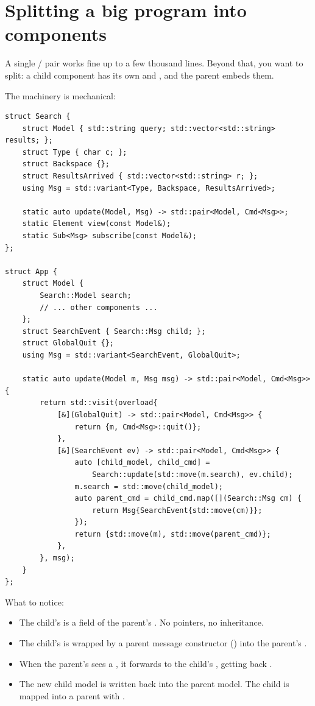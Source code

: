 \section{Splitting a big program into components}
\label{sec:elm:components}

A single  /  pair works fine up to a few
thousand lines. Beyond that, you want to split: a child component
has its own  and , and the parent embeds them.

The machinery is mechanical:

\begin{lstlisting}
struct Search {
    struct Model { std::string query; std::vector<std::string> results; };
    struct Type { char c; };
    struct Backspace {};
    struct ResultsArrived { std::vector<std::string> r; };
    using Msg = std::variant<Type, Backspace, ResultsArrived>;

    static auto update(Model, Msg) -> std::pair<Model, Cmd<Msg>>;
    static Element view(const Model&);
    static Sub<Msg> subscribe(const Model&);
};

struct App {
    struct Model {
        Search::Model search;
        // ... other components ...
    };
    struct SearchEvent { Search::Msg child; };
    struct GlobalQuit {};
    using Msg = std::variant<SearchEvent, GlobalQuit>;

    static auto update(Model m, Msg msg) -> std::pair<Model, Cmd<Msg>> {
        return std::visit(overload{
            [&](GlobalQuit) -> std::pair<Model, Cmd<Msg>> {
                return {m, Cmd<Msg>::quit()};
            },
            [&](SearchEvent ev) -> std::pair<Model, Cmd<Msg>> {
                auto [child_model, child_cmd] =
                    Search::update(std::move(m.search), ev.child);
                m.search = std::move(child_model);
                auto parent_cmd = child_cmd.map([](Search::Msg cm) {
                    return Msg{SearchEvent{std::move(cm)}};
                });
                return {std::move(m), std::move(parent_cmd)};
            },
        }, msg);
    }
};
\end{lstlisting}

What to notice:

\begin{itemize}[leftmargin=*]
  \item The child's  is a field of the parent's
    . No pointers, no inheritance.
  \item The child's  is wrapped by a parent message
    constructor () into the parent's .
  \item When the parent's  sees a ,
    it forwards to the child's , getting back
    .
  \item The new child model is written back into the parent model.
    The child  is mapped into a parent  with
    .
\end{itemize}

